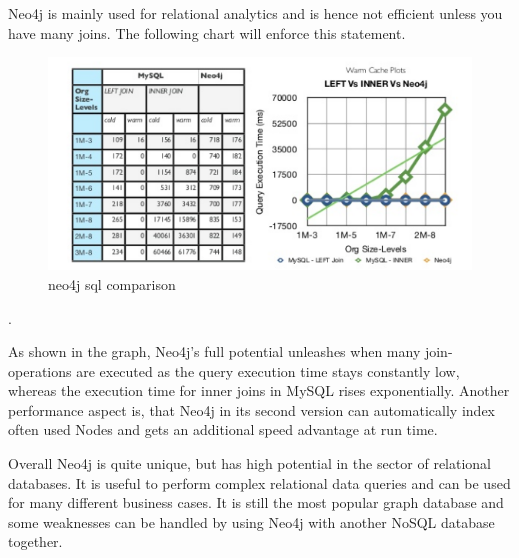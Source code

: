 Neo4j is mainly used for relational analytics and is hence not efficient unless you have many joins. The following chart will enforce this statement.

\begin{figure}[H]
	\includegraphics[width=\linewidth,keepaspectratio]{images/neo4j/neo4j_joins.png}
	\caption{neo4j sql comparison}
\end{figure}  
\cite[slide 19]{Dalal.2014}.

As shown in the graph, Neo4j's full potential unleashes when many join-operations are executed as the query execution time stays constantly low, whereas the execution time for inner joins in MySQL rises exponentially. Another performance aspect is, that Neo4j in its second version can automatically index often used Nodes and gets an additional speed advantage at run time.

Overall Neo4j is quite unique, but has high potential in the sector of relational databases.
It is useful to perform complex relational data queries and can be used for many different business cases.
It is still the most popular graph database and some weaknesses can be handled by using Neo4j with another NoSQL database together.